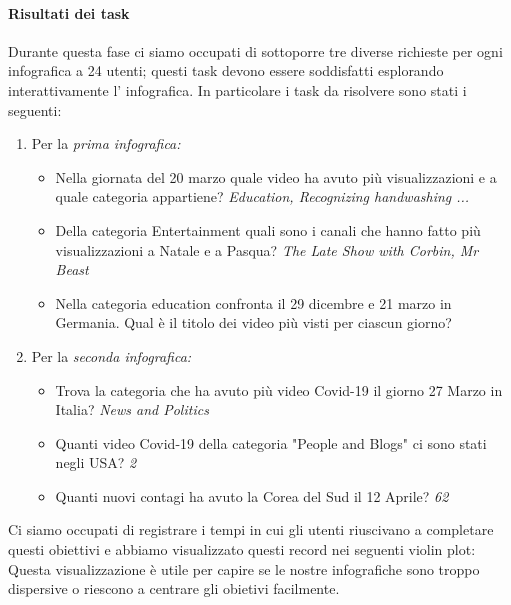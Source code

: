 \documentclass[10pt, a4paper,openany]{article}
\begin{document}
\paragraph{Risultati dei task} Durante questa fase ci siamo occupati di sottoporre tre diverse richieste per ogni infografica a 24 utenti; questi task devono essere soddisfatti esplorando interattivamente l' infografica. In particolare i task da risolvere sono stati i seguenti:
\begin{enumerate}
	\item Per la \textit{prima infografica:}
	\begin{itemize}
		\item Nella giornata del 20 marzo quale video ha avuto più visualizzazioni e a quale categoria appartiene?  \textit{Education, Recognizing handwashing ... }
		\item Della categoria Entertainment quali sono i canali che hanno fatto più visualizzazioni a Natale e a Pasqua? \textit{The Late Show with Corbin, Mr Beast}
		\item Nella categoria education confronta il 29 dicembre e 21 marzo in Germania. Qual è il titolo dei video più visti per ciascun giorno?
	\end{itemize}
	\item Per la \textit{seconda infografica:}
\begin{itemize}
	\item Trova la categoria che ha avuto più video Covid-19 il giorno 27 Marzo in Italia? \textit{News and Politics}
	\item Quanti video Covid-19 della categoria "People and Blogs" ci sono stati negli USA? \textit{2}
	\item Quanti nuovi contagi ha avuto la Corea del Sud il 12 Aprile? \textit{62}
\end{itemize}
\end{enumerate}

Ci siamo occupati di registrare i tempi in cui gli utenti riuscivano a completare questi obiettivi e abbiamo visualizzato questi record nei seguenti violin plot:
Questa visualizzazione è utile per capire se le nostre infografiche sono troppo dispersive o riescono a centrare gli obietivi facilmente.
\end{document}
